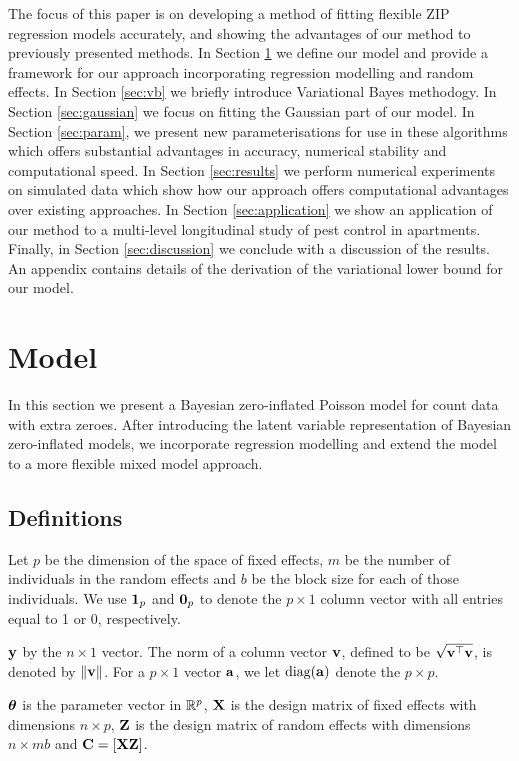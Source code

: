 \documentclass{amsart}[12pt]
\begin{document}
The focus of this paper is on developing a method of fitting flexible ZIP regression models accurately, and
showing the advantages of our method to previously presented methods. In Section \ref{sec:model} we define our
model and provide a framework for our approach incorporating regression modelling and random effects. In
Section \ref{sec:vb} we briefly introduce Variational Bayes methodogy. In Section \ref{sec:gaussian} we
focus on fitting the Gaussian part of our model. In Section \ref{sec:param}, we present new parameterisations for
use in these algorithms which offers substantial advantages in accuracy, numerical stability and computational
speed. In Section \ref{sec:results} we perform numerical experiments on simulated data which show how our
approach offers computational advantages over existing approaches. In Section \ref{sec:application} we show an
application of our method to a multi-level longitudinal study of pest control in apartments. Finally, in
Section \ref{sec:discussion} we conclude with a discussion of the results. An appendix contains details of the
derivation of the variational lower bound for our model.

\section{Model}
\label{sec:model}

In this section we present a Bayesian zero-inflated Poisson model for count data with extra zeroes. After
introducing the latent variable representation of Bayesian zero-inflated models, we incorporate regression
modelling and extend the model to a more flexible mixed model approach.

\subsection{Definitions}

Let $p$ be the dimension of the space of fixed effects, $m$ be the number of individuals in the random effects
and $b$ be the block size for each of those individuals.
We use ${\bf 1}_p$ and ${\bf 0}_p$ to denote the $p \times 1$ column vector with all entries equal to 1 or 0,
respectively.

${\bf y}$ by the $n \times 1$ vector. The norm of a column vector ${\bf v}$, defined to be $\sqrt{{\bf v}^\top {\bf v}}$, is 
denoted by $\|{\bf v}\|$. For a $p \times 1$ vector ${\bf a}$, we let $\text{diag}{({\bf a})}$ denote the $p \times p$.

${\boldsymbol \theta}$ is the parameter vector in ${\mathbb{R}}^p$,
${\bf X}$ is the design matrix of fixed effects with dimensions $n \times p$,
${\bf Z}$ is the design matrix of random effects with dimensions $n \times m b$
and ${\bf C} = [ {\bf X} {\bf Z} ]$.
\end{document}
